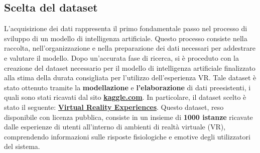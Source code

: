 \subsection{Scelta del dataset}
\fancyhead{}    %
\par{
L'acquisizione dei dati rappresenta il primo fondamentale passo nel processo di sviluppo di un modello di intelligenza artificiale. Questo processo consiste nella raccolta, nell'organizzazione e nella preparazione dei dati necessari per addestrare e valutare il modello.\newline
Dopo un'accurata fase di ricerca, si è proceduto con la creazione del dataset necessario per il modello di intelligenza artificiale finalizzato alla stima della durata consigliata per l'utilizzo dell'esperienza VR.\newline
Tale dataset è stato ottenuto tramite la \textbf{modellazione} e \textbf {l'elaborazione} di dati preesistenti, i quali sono stati ricavati dal sito \href{https://www.kaggle.com/}{\textbf{kaggle.com}}.\newline
In particolare, il dataset scelto è stato il seguente: \href{https://www.kaggle.com/datasets/aakashjoshi123/virtual-reality-experiences/data}{\textbf{Virtual Reality Experiences}}.\newline
Questo dataset, reso disponibile con licenza pubblica, consiste in un insieme di \textbf{1000 istanze} ricavate dalle esperienze di  utenti all'interno di ambienti di realtà virtuale (VR),
comprendendo informazioni sulle risposte fisiologiche e emotive degli utilizzatori del sistema.
}